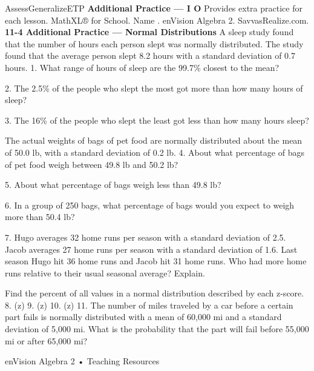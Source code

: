 \documentclass{article}
\newenvironment{te-addendum}[2]{}{}     %
\newcommand{\answer}[1]{}               %
\begin{document}
\begin{te-addendum}{Assess}{GeneralizeETP}
\textbf{Additional Practice — I O}
Provides extra practice for each lesson. MathXL® for School.
Name \underline{\hspace{2cm}}. enVision Algebra 2. SavvasRealize.com.
\textbf{11-4 Additional Practice — Normal Distributions}
A sleep study found that the number of hours each person slept was normally distributed. The study found that the average person slept 8.2 hours with a standard deviation of 0.7 hours.
1. What range of hours of sleep are the 99.7\% closest to the mean?
\answer{6.1 to 10.3 h}
2. The 2.5\% of the people who slept the most got more than how many hours of sleep?
\answer{9.6 h}
3. The 16\% of the people who slept the least got less than how many hours sleep?
\answer{7.5 h}
The actual weights of bags of pet food are normally distributed about the mean of 50.0 lb, with a standard deviation of 0.2 lb.
4. About what percentage of bags of pet food weigh between 49.8 lb and 50.2 lb?
\answer{68\%}
5. About what percentage of bags weigh less than 49.8 lb?
\answer{16\%}
6. In a group of 250 bags, what percentage of bags would you expect to weigh more than 50.4 lb?
\answer{2.5\%}
7. Hugo averages 32 home runs per season with a standard deviation of 2.5. Jacob averages 27 home runs per season with a standard deviation of 1.6. Last season Hugo hit 36 home runs and Jacob hit 31 home runs. Who had more home runs relative to their usual seasonal average? Explain.
\answer{Jacob; Hugo homered 1.6 standard deviations above his average while Jacob homered 2.5 standard deviations above his average.}
Find the percent of all values in a normal distribution described by each z-score.
8. (z) \answer{89.25\%}
9. (z) \answer{0.03\%}
10. (z) \answer{16.35\%}
11. The number of miles traveled by a car before a certain part fails is normally distributed with a mean of 60,000 mi and a standard deviation of 5,000 mi. What is the probability that the part will fail before 55,000 mi or after 65,000 mi?
\answer{32\%}
enVision Algebra 2 • Teaching Resources
\end{te-addendum}
\end{document}
